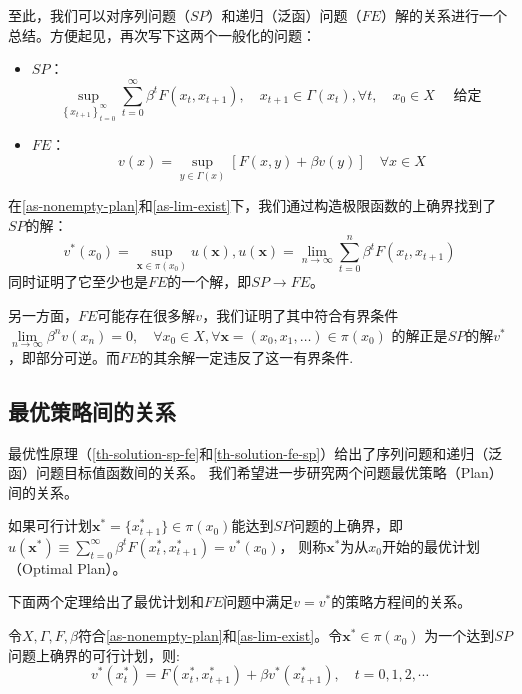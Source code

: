 至此，我们可以对序列问题（$SP$）和递归（泛函）问题（$FE$）解的关系进行一个总结。方便起见，再次写下这两个一般化的问题：
\begin{itemize}
    \item $SP$：
    $$\sup _{\left\{x_{t+1}\right\}_{t=0}^{\infty}} \sum_{t=0}^{\infty} \beta^t F\left(x_t, x_{t+1}\right),
    \quad x_{t+1}  \in \Gamma\left(x_t\right), \forall t, \quad x_0 \in X \quad \text { 给定 }
    $$
    \item $FE$：
    $$
    v(x)=\sup _{y \in \Gamma(x)}[F(x, y)+\beta v(y)] \quad \forall x \in X
    $$
\end{itemize}

在\cref{as-nonempty-plan}和\cref{as-lim-exist}下，我们通过构造极限函数的上确界找到了$SP$的解：
$$
v^*\left(x_0\right)=\sup _{\boldsymbol{x}\in\pi\left(x_0\right)}u\left(\boldsymbol{x}\right), 
u\left(\boldsymbol{x}\right)=\lim_{n\rightarrow\infty}\sum_{t=0}^{n}\beta^t F\left(x_t,x_{t+1}\right)
$$
同时证明了它至少也是$FE$的一个解，即$SP\rightarrow FE$。

另一方面，$FE$可能存在很多解$v$，我们证明了其中符合有界条件
$
\lim\limits_{n\rightarrow \infty}\beta^n v\left(x_n\right)=0, \quad \forall x_0\in X, 
    \forall \boldsymbol{x}=\left(x_0,x_1,\dots\right)\in \pi\left(x_0\right)
$
的解正是$SP$的解$v^*$，即部分可逆。而$FE$的其余解一定违反了这一有界条件.


\subsection{最优策略间的关系}

最优性原理（\cref{th-solution-sp-fe}和\cref{th-solution-fe-sp}）给出了序列问题和递归（泛函）问题目标值函数间的关系。
我们希望进一步研究两个问题最优策略（Plan）间的关系。

\begin{definition}[最优计划]
    如果可行计划$\boldsymbol{x}^* = \{x_{t+1}^*\} \in\pi\left(x_0\right)$能达到$SP$问题的上确界，即
    $u\left(\boldsymbol{x}^*\right) \equiv \sum_{t=0}^{\infty}\beta^t F\left(x_t^*,x_{t+1}^*\right) = v^*\left(x_0\right)$，
    则称$\boldsymbol{x}^*$为从$x_0$开始的最优计划（Optimal Plan）。
\end{definition}
下面两个定理给出了最优计划和$FE$问题中满足$v=v^*$的策略方程间的关系。

\begin{theorem} \label{th-policy-sp-fe}
    令$X, \Gamma, F, \beta$符合\cref{as-nonempty-plan}和\cref{as-lim-exist}。令$\boldsymbol{x}^*\in \pi\left(x_0\right)$
    为一个达到$SP$问题上确界的可行计划，则:
    \begin{equation} \label{eq-opt-plan-sp}
        v^*\left(x_t^*\right) = F\left(x_t^*,x_{t+1}^*\right) + \beta v^*\left(x_{t+1}^*\right), \quad t=0,1,2,\cdots
    \end{equation}
\end{theorem}

